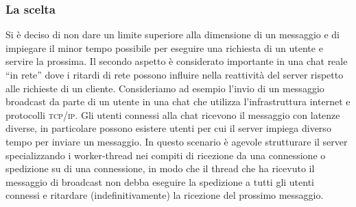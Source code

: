 \documentclass[a4paper,10pt]{article}
\begin{document}
\subsubsection{La scelta}
Si \`e deciso di non dare un limite superiore alla dimensione di un
messaggio e di impiegare il minor tempo possibile per eseguire una
richiesta di un utente e servire la prossima. Il secondo aspetto \`e
considerato importante in una chat reale ``in rete'' dove i ritardi di
rete possono influire nella reattivit\`a del server rispetto alle
richieste di un cliente. Consideriamo ad esempio l'invio di un
messaggio broadcast da parte di un utente in una chat che utilizza
l'infrastruttura internet e protocolli \textsc{tcp/ip}. Gli utenti
connessi alla chat ricevono il messaggio con latenze diverse, in
particolare possono esistere utenti per cui il server impiega diverso
tempo per inviare un messaggio. In questo scenario \`e agevole
strutturare il server specializzando i worker-thread nei compiti di
ricezione da una connessione o spedizione su di una connessione, in
modo che il thread che ha ricevuto il messaggio di broadcast non debba
eseguire la spedizione a tutti gli utenti connessi e ritardare
(indefinitivamente) la ricezione del prossimo messaggio. 
\end{document}
